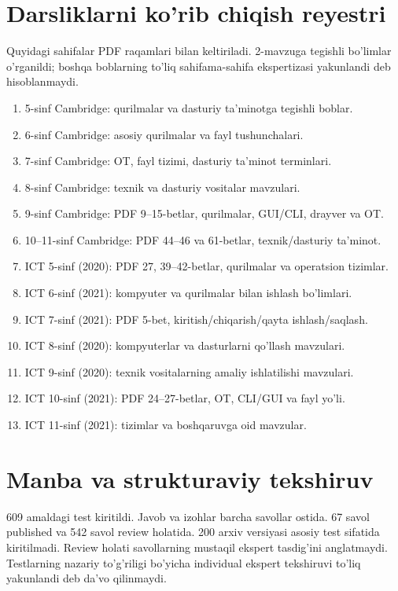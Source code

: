 \documentclass[10pt,a4paper]{article}
\begin{document}
\section{Darsliklarni ko'rib chiqish reyestri}
Quyidagi sahifalar PDF raqamlari bilan keltiriladi. 2-mavzuga tegishli
bo'limlar o'rganildi; boshqa boblarning to'liq sahifama-sahifa
ekspertizasi yakunlandi deb hisoblanmaydi.
\begin{enumerate}[leftmargin=10mm]
\item 5-sinf Cambridge: qurilmalar va dasturiy ta'minotga tegishli boblar.
\item 6-sinf Cambridge: asosiy qurilmalar va fayl tushunchalari.
\item 7-sinf Cambridge: OT, fayl tizimi, dasturiy ta'minot terminlari.
\item 8-sinf Cambridge: texnik va dasturiy vositalar mavzulari.
\item 9-sinf Cambridge: PDF 9--15-betlar, qurilmalar, GUI/CLI, drayver va OT.
\item 10--11-sinf Cambridge: PDF 44--46 va 61-betlar, texnik/dasturiy ta'minot.
\item ICT 5-sinf (2020): PDF 27, 39--42-betlar, qurilmalar va operatsion tizimlar.
\item ICT 6-sinf (2021): kompyuter va qurilmalar bilan ishlash bo'limlari.
\item ICT 7-sinf (2021): PDF 5-bet, kiritish/chiqarish/qayta ishlash/saqlash.
\item ICT 8-sinf (2020): kompyuterlar va dasturlarni qo'llash mavzulari.
\item ICT 9-sinf (2020): texnik vositalarning amaliy ishlatilishi mavzulari.
\item ICT 10-sinf (2021): PDF 24--27-betlar, OT, CLI/GUI va fayl yo'li.
\item ICT 11-sinf (2021): tizimlar va boshqaruvga oid mavzular.
\end{enumerate}
\section*{Manba va strukturaviy tekshiruv}
609 amaldagi test kiritildi. Javob va izohlar barcha savollar ostida.
67 savol published va 542 savol review holatida.
200 arxiv versiyasi asosiy test sifatida kiritilmadi.
Review holati savollarning mustaqil ekspert tasdig'ini anglatmaydi.
Testlarning nazariy to'g'riligi bo'yicha individual ekspert tekshiruvi
to'liq yakunlandi deb da'vo qilinmaydi.
\end{document}
